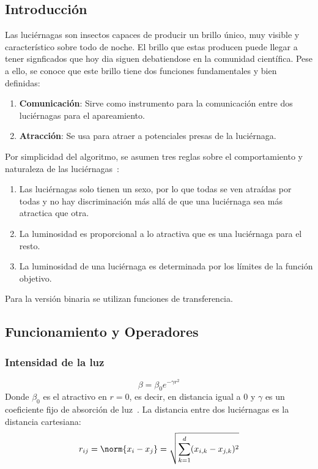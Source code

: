 \subsection{Introducción}
Las luciérnagas son insectos capaces de producir un brillo único, muy visible y característico sobre todo de noche. El brillo que estas producen puede llegar a tener signficados que hoy dia siguen debatiendose en la comunidad científica. Pese a ello, se conoce que este brillo tiene dos funciones fundamentales y bien definidas:
\begin{enumerate}
    \item \textbf{Comunicación}: Sirve como instrumento para la comunicación entre dos luciérnagas para el apareamiento.
    \item \textbf{Atracción}: Se usa para atraer a potenciales presas de la luciérnaga.
\end{enumerate}
Por simplicidad del algoritmo, se asumen tres reglas sobre el comportamiento y naturaleza de las luciérnagas~\cite{yang_chapter_2014}:
\begin{enumerate}
    \item Las luciérnagas solo tienen un sexo, por lo que todas se ven atraídas por todas y no hay discriminación más allá de que una luciérnaga sea más atractica que otra.
    \item La luminosidad es proporcional a lo atractiva que es una luciérnaga para el resto.
    \item La luminosidad de una luciérnaga es determinada por los límites de la función objetivo.
\end{enumerate}
Para la versión binaria se utilizan funciones de transferencia.

\subsection{Funcionamiento y Operadores}
\subsubsection{Intensidad de la luz}
\begin{equation}
    \beta = \beta_0 e^{-\gamma r^2}
\end{equation}
Donde $\beta_0$ es el atractivo en $r=0$, es decir, en distancia igual a $0$ y $\gamma$ es un coeficiente fijo de absorción de luz~\cite{yang_chapter_2014}. La distancia entre dos luciérnagas es la distancia cartesiana:
\begin{equation}
    r_{ij}=\norm{x_i-x_j}=\sqrt{\sum_{k=1}^d(x_{i,k}-x_{j,k})^2}
\end{equation}

